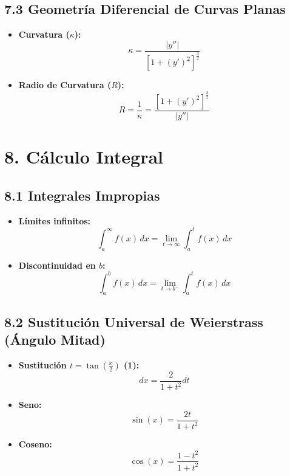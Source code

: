 \documentclass[11pt,a4paper]{article}
\begin{document}
\subsection*{7.3 Geometría Diferencial de Curvas Planas}

\begin{itemize}
  \item \textbf{Curvatura ($\kappa$):}
  \[
    \kappa = \frac{|y''|}{[1 + (y')^2]^{\frac{3}{2}}}
  \]
  \item \textbf{Radio de Curvatura ($R$):}
  \[
    R = \frac{1}{\kappa} = \frac{[1 + (y')^2]^{\frac{3}{2}}}{|y''|}
  \]
\end{itemize}

\section*{8. Cálculo Integral}

\subsection*{8.1 Integrales Impropias}

\begin{itemize}
  \item \textbf{Límites infinitos:}
  \[
    \int_a^\infty f(x) \, dx = \lim_{t \to \infty} \int_a^t f(x) \, dx
  \]
  \item \textbf{Discontinuidad en $b$:}
  \[
    \int_a^b f(x) \, dx = \lim_{t \to b^-} \int_a^t f(x) \, dx
  \]
\end{itemize}

\subsection*{8.2 Sustitución Universal de Weierstrass (Ángulo Mitad)}

\begin{itemize}
  \item \textbf{Sustitución $t = \tan\left(\frac{x}{2}\right)$ (1):}
  \[
    dx = \frac{2}{1 + t^2} dt
  \]
  \item \textbf{Seno:}
  \[
    \sin(x) = \frac{2t}{1 + t^2}
  \]
  \item \textbf{Coseno:}
  \[
    \cos(x) = \frac{1 - t^2}{1 + t^2}
  \]
\end{itemize}
\end{document}
